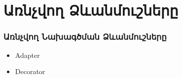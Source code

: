 \documentclass{beamer}
\begin{document}
\section{Առնչվող Ձևանմուշները}
\begin{frame}\frametitle{Առնչվող Նախագծման Ձևանմուշները}
\begin{itemize}
    \item Adapter
    \item Decorator
\end{itemize}
\end{frame}
\end{document}
